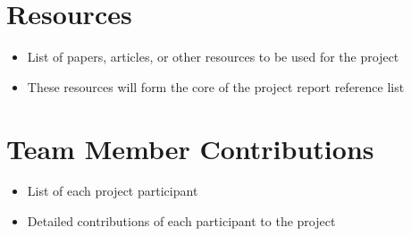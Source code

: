 \documentclass{article}
\begin{document}
\section{Resources}

\begin{itemize}
    \item List of papers, articles, or other resources to be used for the
          project
    \item These resources will form the core of the project report reference
          list
\end{itemize}

\section{Team Member Contributions}

\begin{itemize}
    \item List of each project participant
    \item Detailed contributions of each participant to the project
\end{itemize}
\end{document}
